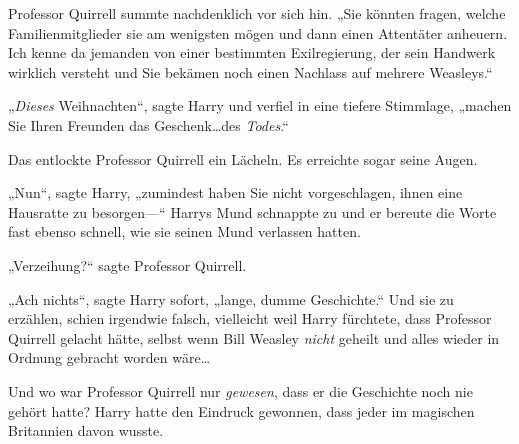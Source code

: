 Professor Quirrell summte nachdenklich vor sich hin.
„Sie könnten fragen, welche Familienmitglieder sie am wenigsten mögen und dann einen Attentäter anheuern. Ich kenne da jemanden von einer bestimmten Exilregierung, der sein Handwerk wirklich versteht und Sie bekämen noch einen Nachlass auf mehrere Weasleys.“

„\emph{Dieses} Weihnachten“, sagte Harry und verfiel in eine tiefere Stimmlage, „machen Sie Ihren Freunden das Geschenk…des \emph{Todes}.“

Das entlockte Professor Quirrell ein Lächeln. Es erreichte sogar seine Augen.

„Nun“, sagte Harry, „zumindest haben Sie nicht vorgeschlagen, ihnen eine Hausratte zu besorgen—“ Harrys Mund schnappte zu und er bereute die Worte fast ebenso schnell, wie sie seinen Mund verlassen hatten.

„Verzeihung?“ sagte Professor Quirrell.

„Ach nichts“, sagte Harry sofort, „lange, dumme Geschichte.“ Und sie zu erzählen, schien irgendwie falsch, vielleicht weil Harry fürchtete, dass Professor Quirrell gelacht hätte, selbst wenn Bill Weasley \emph{nicht} geheilt und alles wieder in Ordnung gebracht worden wäre…

Und wo war Professor Quirrell nur \emph{gewesen}, dass er die Geschichte noch nie gehört hatte? Harry hatte den Eindruck gewonnen, dass jeder im magischen Britannien davon wusste.

